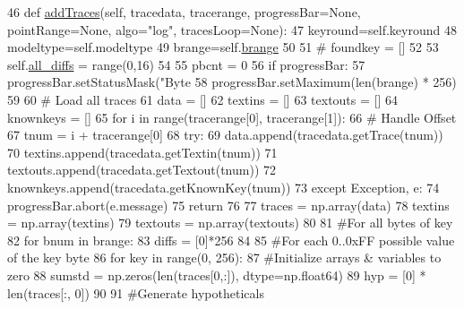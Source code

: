 \begin{DoxyCode}
46     \textcolor{keyword}{def }\hyperlink{classsoftware_1_1chipwhisperer_1_1analyzer_1_1attacks_1_1cpa__algorithms_1_1bayesian_1_1AttackCPA__Bayesian_ab560b2b5293ea4f138fe12e4e0e7514f}{addTraces}(self, tracedata, tracerange, progressBar=None, pointRange=None, algo="log", 
      tracesLoop=None):
47         keyround=self.keyround
48         modeltype=self.modeltype
49         brange=self.\hyperlink{classsoftware_1_1chipwhisperer_1_1analyzer_1_1attacks_1_1cpa__algorithms_1_1bayesian_1_1AttackCPA__Bayesian_af7bc6ec8a96232a156c4037e096d0b4f}{brange}
50 
51         \textcolor{comment}{# foundkey = []}
52 
53         self.\hyperlink{classsoftware_1_1chipwhisperer_1_1analyzer_1_1attacks_1_1cpa__algorithms_1_1bayesian_1_1AttackCPA__Bayesian_a5532b7afae0ffa6daa7b093765505da9}{all\_diffs} = range(0,16)
54 
55         pbcnt = 0
56         \textcolor{keywordflow}{if} progressBar:
57             progressBar.setStatusMask(\textcolor{stringliteral}{"Byte %
58             progressBar.setMaximum(len(brange) * 256)
59 
60         \textcolor{comment}{# Load all traces}
61         data = []
62         textins = []
63         textouts = []
64         knownkeys = []
65         \textcolor{keywordflow}{for} i \textcolor{keywordflow}{in} range(tracerange[0], tracerange[1]):
66             \textcolor{comment}{# Handle Offset}
67             tnum = i + tracerange[0]
68             \textcolor{keywordflow}{try}:
69                 data.append(tracedata.getTrace(tnum))
70                 textins.append(tracedata.getTextin(tnum))
71                 textouts.append(tracedata.getTextout(tnum))
72                 knownkeys.append(tracedata.getKnownKey(tnum))
73             \textcolor{keywordflow}{except} Exception, e:
74                 progressBar.abort(e.message)
75                 \textcolor{keywordflow}{return}
76 
77         traces = np.array(data)
78         textins = np.array(textins)
79         textouts = np.array(textouts)
80 
81         \textcolor{comment}{#For all bytes of key}
82         \textcolor{keywordflow}{for} bnum \textcolor{keywordflow}{in} brange:
83             diffs = [0]*256
84 
85             \textcolor{comment}{#For each 0..0xFF possible value of the key byte}
86             \textcolor{keywordflow}{for} key \textcolor{keywordflow}{in} range(0, 256):
87                 \textcolor{comment}{#Initialize arrays & variables to zero}
88                 sumstd = np.zeros(len(traces[0,:]), dtype=np.float64)
89                 hyp = [0] * len(traces[:, 0])
90 
91                 \textcolor{comment}{#Generate hypotheticals}
}
\end{DoxyCode}
